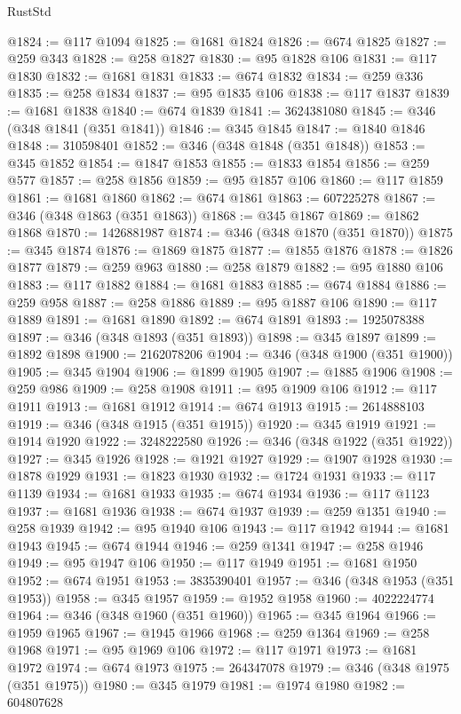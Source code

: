 \begin{lexlean}{RustStd}
\begin{coremodule}
{\begin{coremodule}
{{{{{{{{{{{{{{{{{{{{{{{{{{{{{{{{{{{{{{{@1824 := @117 @1094
@1825 := @1681 @1824
@1826 := @674 @1825
@1827 := @259 @343
@1828 := @258 @1827
@1830 := @95 @1828 @106
@1831 := @117 @1830
@1832 := @1681 @1831
@1833 := @674 @1832
@1834 := @259 @336
@1835 := @258 @1834
@1837 := @95 @1835 @106
@1838 := @117 @1837
@1839 := @1681 @1838
@1840 := @674 @1839
@1841 := 3624381080
@1845 := @346 (@348 @1841 (@351 @1841))
@1846 := @345 @1845
@1847 := @1840 @1846
@1848 := 310598401
@1852 := @346 (@348 @1848 (@351 @1848))
@1853 := @345 @1852
@1854 := @1847 @1853
@1855 := @1833 @1854
@1856 := @259 @577
@1857 := @258 @1856
@1859 := @95 @1857 @106
@1860 := @117 @1859
@1861 := @1681 @1860
@1862 := @674 @1861
@1863 := 607225278
@1867 := @346 (@348 @1863 (@351 @1863))
@1868 := @345 @1867
@1869 := @1862 @1868
@1870 := 1426881987
@1874 := @346 (@348 @1870 (@351 @1870))
@1875 := @345 @1874
@1876 := @1869 @1875
@1877 := @1855 @1876
@1878 := @1826 @1877
@1879 := @259 @963
@1880 := @258 @1879
@1882 := @95 @1880 @106
@1883 := @117 @1882
@1884 := @1681 @1883
@1885 := @674 @1884
@1886 := @259 @958
@1887 := @258 @1886
@1889 := @95 @1887 @106
@1890 := @117 @1889
@1891 := @1681 @1890
@1892 := @674 @1891
@1893 := 1925078388
@1897 := @346 (@348 @1893 (@351 @1893))
@1898 := @345 @1897
@1899 := @1892 @1898
@1900 := 2162078206
@1904 := @346 (@348 @1900 (@351 @1900))
@1905 := @345 @1904
@1906 := @1899 @1905
@1907 := @1885 @1906
@1908 := @259 @986
@1909 := @258 @1908
@1911 := @95 @1909 @106
@1912 := @117 @1911
@1913 := @1681 @1912
@1914 := @674 @1913
@1915 := 2614888103
@1919 := @346 (@348 @1915 (@351 @1915))
@1920 := @345 @1919
@1921 := @1914 @1920
@1922 := 3248222580
@1926 := @346 (@348 @1922 (@351 @1922))
@1927 := @345 @1926
@1928 := @1921 @1927
@1929 := @1907 @1928
@1930 := @1878 @1929
@1931 := @1823 @1930
@1932 := @1724 @1931
@1933 := @117 @1139
@1934 := @1681 @1933
@1935 := @674 @1934
@1936 := @117 @1123
@1937 := @1681 @1936
@1938 := @674 @1937
@1939 := @259 @1351
@1940 := @258 @1939
@1942 := @95 @1940 @106
@1943 := @117 @1942
@1944 := @1681 @1943
@1945 := @674 @1944
@1946 := @259 @1341
@1947 := @258 @1946
@1949 := @95 @1947 @106
@1950 := @117 @1949
@1951 := @1681 @1950
@1952 := @674 @1951
@1953 := 3835390401
@1957 := @346 (@348 @1953 (@351 @1953))
@1958 := @345 @1957
@1959 := @1952 @1958
@1960 := 4022224774
@1964 := @346 (@348 @1960 (@351 @1960))
@1965 := @345 @1964
@1966 := @1959 @1965
@1967 := @1945 @1966
@1968 := @259 @1364
@1969 := @258 @1968
@1971 := @95 @1969 @106
@1972 := @117 @1971
@1973 := @1681 @1972
@1974 := @674 @1973
@1975 := 264347078
@1979 := @346 (@348 @1975 (@351 @1975))
@1980 := @345 @1979
@1981 := @1974 @1980
@1982 := 604807628
}}}}}}}}}}}}}}}}}}}}}}}}}}}}}}}}}}}}}}}
\end{coremodule}}
\end{coremodule}
\end{lexlean}
